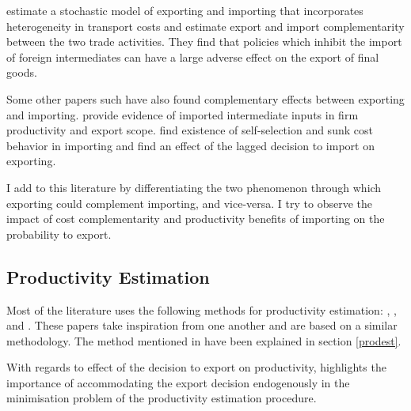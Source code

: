 \documentclass[12pt]{article}
\begin{document}
\textcite{kasahara2013productivity} estimate a stochastic model of
exporting and importing that incorporates heterogeneity in transport
costs and estimate export and import complementarity between the two
trade activities. They find that policies which inhibit the
import of  foreign intermediates can have a large adverse 
effect on the export of final goods.  

Some other papers such have also found complementary effects between
exporting and importing. \textcite{vogel2010higher} provide evidence of imported
intermediate inputs in firm productivity and export scope. 
 \textcite{muuls2009imports} find
existence of self-selection and sunk cost behavior in importing and
find an effect of the lagged decision to import on exporting.

I add to this literature by differentiating the two phenomenon through
which exporting could complement importing, and vice-versa. I try to observe the impact of cost
complementarity and productivity benefits of importing on the
probability to export.  


\subsection*{Productivity Estimation}
Most of the literature uses
the following methods for productivity estimation: 
\textcite{olley1992dynamics}, \textcite{levinsohn2003estimating},
\textcite{ackerberg2006structural} and \textcite{wooldridge2009estimating}. 
These papers take inspiration from one another and are based on a
similar methodology. The method
mentioned in \textcite{olley1992dynamics}
have been explained in section \ref{prodest}.

With regards to effect of the decision to export on productivity, \textcite{de2013detecting} highlights the importance of accommodating
the export decision endogenously in the minimisation problem of the productivity
estimation procedure.
\end{document}
